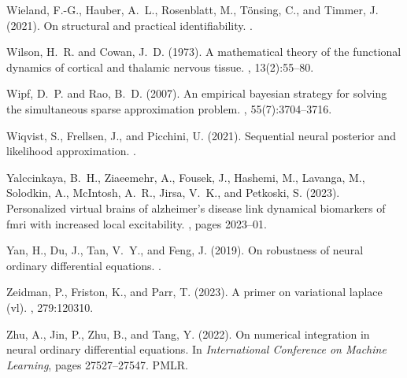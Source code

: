 \documentclass[12pt]{article}
\begin{document}
\begin{thebibliography}{}
Wieland, F.-G., Hauber, A.~L., Rosenblatt, M., T{\"o}nsing, C., and Timmer, J.
  (2021).
\newblock On structural and practical identifiability.
.

Wilson, H.~R. and Cowan, J.~D. (1973).
\newblock A mathematical theory of the functional dynamics of cortical and
  thalamic nervous tissue.
, 13(2):55--80.

Wipf, D.~P. and Rao, B.~D. (2007).
\newblock An empirical bayesian strategy for solving the simultaneous sparse
  approximation problem.
, 55(7):3704--3716.

Wiqvist, S., Frellsen, J., and Picchini, U. (2021).
\newblock Sequential neural posterior and likelihood approximation.
.

Yalccinkaya, B.~H., Ziaeemehr, A., Fousek, J., Hashemi, M., Lavanga, M.,
  Solodkin, A., McIntosh, A.~R., Jirsa, V.~K., and Petkoski, S. (2023).
\newblock Personalized virtual brains of alzheimer's disease link dynamical
  biomarkers of fmri with increased local excitability.
, pages 2023--01.

Yan, H., Du, J., Tan, V.~Y., and Feng, J. (2019).
\newblock On robustness of neural ordinary differential equations.
.

Zeidman, P., Friston, K., and Parr, T. (2023).
\newblock A primer on variational laplace (vl).
, 279:120310.

Zhu, A., Jin, P., Zhu, B., and Tang, Y. (2022).
\newblock On numerical integration in neural ordinary differential equations.
\newblock In {\em International Conference on Machine Learning}, pages
  27527--27547. PMLR.

\end{thebibliography}
\end{document}
